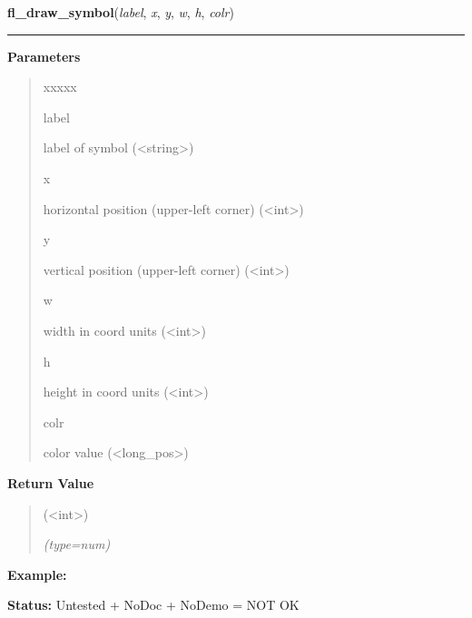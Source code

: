     \label{xformslib:library:fl_draw_symbol}

    \vspace{0.5ex}

\hspace{.8\funcindent}\begin{boxedminipage}{\funcwidth}

    \raggedright \textbf{fl\_draw\_symbol}(\textit{label}, \textit{x}, \textit{y}, \textit{w}, \textit{h}, \textit{colr})

    \vspace{-1.5ex}

    \rule{\textwidth}{0.5\fboxrule}
\setlength{\parskip}{2ex}
\setlength{\parskip}{1ex}
      \textbf{Parameters}
      \vspace{-1ex}

      \begin{quote}
        \begin{Ventry}{xxxxx}

          \item[label]

          label of symbol ({\textless}string{\textgreater})

          \item[x]

          horizontal position (upper-left corner) 
          ({\textless}int{\textgreater})

          \item[y]

          vertical position (upper-left corner) 
          ({\textless}int{\textgreater})

          \item[w]

          width in coord units ({\textless}int{\textgreater})

          \item[h]

          height in coord units ({\textless}int{\textgreater})

          \item[colr]

          color value ({\textless}long\_pos{\textgreater})

        \end{Ventry}

      \end{quote}

      \textbf{Return Value}
    \vspace{-1ex}

      \begin{quote}
      ({\textless}int{\textgreater})

      {\it (type=num)}

      \end{quote}

\textbf{Example:} 

\textbf{Status:} Untested + NoDoc + NoDemo = NOT OK



    \end{boxedminipage}

